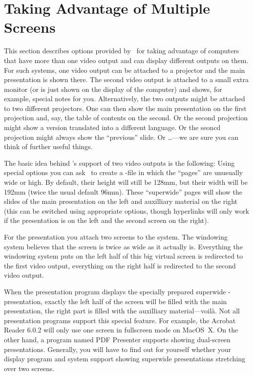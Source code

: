%
%
%


\section{Taking Advantage of Multiple Screens}
\label{section-twoscreens}

This section describes options provided by \beamer\ for taking advantage of computers that have more than one video output and can display different outputs on them. For such systems, one video output can be attached to a projector and the main presentation is shown there. The second video output is attached to a small extra monitor (or is just shown on the display of the computer) and shows, for example, special notes for you. Alternatively, the two outputs might be attached to two different projectors. One can then show the main presentation on the first projection and, say, the table of contents on the second. Or the second projection might show a version translated into a different language. Or the seoncd projection might always show the ``previous'' slide. Or \ldots---we are sure you can think of further useful things.

The basic idea behind \beamer's support of two video outputs is the following: Using special options you can ask \beamer\ to create a \pdf-file in which the ``pages'' are unusually wide or high. By default, their height will still be 128mm, but their width will be 192mm (twice the usual default 96mm). These ``superwide'' pages will show the slides of the main presentation on the left and auxilliary material on the right (this can be switched using appropriate options, though hyperlinks will only work if the presentation is on the left and the second screen on the right).

For the presentation you attach two screens to the system. The windowing system believes that the screen is twice as wide as it actually is. Everything the windowing system puts on the left half of this big virtual screen is redirected to the first video output, everything on the right half is redirected to the second video output.

When the presentation program displays the specially prepared superwide \beamer-presentation, exactly the left half of the screen will be filled with the main presentation, the right part is filled with the auxilliary material---voil\`a. Not all presentation programs support this special feature. For example, the Acrobat Reader 6.0.2 will only use one screen in fullscreen mode on MacOS~X. On the other hand, a program named PDF Presenter supports showing dual-screen presentations. Generally, you will have to find out for yourself whether your display program and system support showing superwide presentations stretching over two screens.

